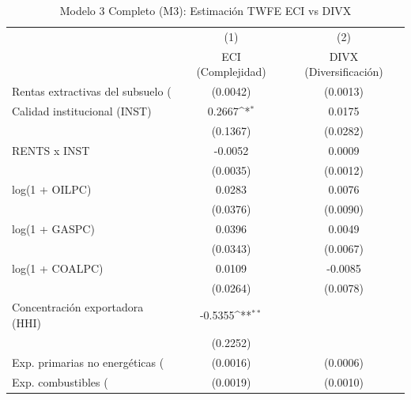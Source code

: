 \begin{table}[htbp]\centering
\def\sym#1{\ifmmode^{#1}\else\(^{#1}\)\fi}
\caption{Modelo 3 Completo (M3): Estimación TWFE ECI vs DIVX}
\begin{tabular}{l*{2}{c}}
\toprule
                    &\multicolumn{1}{c}{(1)}&\multicolumn{1}{c}{(2)}\\
                    &\multicolumn{1}{c}{ECI (Complejidad)}&\multicolumn{1}{c}{DIVX (Diversificación)}\\
\midrule
Rentas extractivas del subsuelo (%
                    &    (0.0042)         &    (0.0013)         \\
\addlinespace
Calidad institucional (INST)&      0.2667\sym{*}  &      0.0175         \\
                    &    (0.1367)         &    (0.0282)         \\
\addlinespace
RENTS x INST        &     -0.0052         &      0.0009         \\
                    &    (0.0035)         &    (0.0012)         \\
\addlinespace
log(1 + OILPC)      &      0.0283         &      0.0076         \\
                    &    (0.0376)         &    (0.0090)         \\
\addlinespace
log(1 + GASPC)      &      0.0396         &      0.0049         \\
                    &    (0.0343)         &    (0.0067)         \\
\addlinespace
log(1 + COALPC)     &      0.0109         &     -0.0085         \\
                    &    (0.0264)         &    (0.0078)         \\
\addlinespace
Concentración exportadora (HHI)&     -0.5355\sym{**} &                     \\
                    &    (0.2252)         &                     \\
\addlinespace
Exp. primarias no energéticas (%
                    &    (0.0016)         &    (0.0006)         \\
\addlinespace
Exp. combustibles (%
                    &    (0.0019)         &    (0.0010)         \\

\end{tabular}
\end{table}
